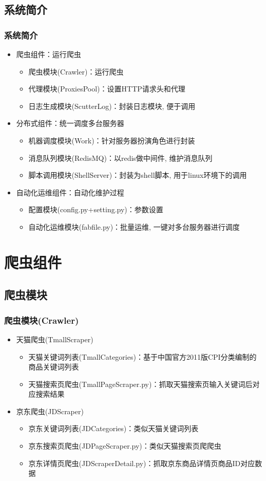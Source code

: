 \documentclass{beamer}
\begin{document}
\subsection{系统简介}
\begin{frame}
\frametitle{系统简介}
\begin{itemize}
\item 爬虫组件：运行爬虫
\begin{itemize}
  \item 爬虫模块(Crawler)：运行爬虫
  \item 代理模块(ProxiesPool)：设置HTTP请求头和代理
  \item 日志生成模块(ScutterLog)：封装日志模块, 便于调用
\end{itemize}
\item 分布式组件：统一调度多台服务器
\begin{itemize}
  \item 机器调度模块(Work)：针对服务器扮演角色进行封装
  \item 消息队列模块(RedisMQ)：以redis做中间件, 维护消息队列
  \item 脚本调用模块(ShellServer)：封装为shell脚本, 用于linux环境下的调用
\end{itemize}
\item 自动化运维组件：自动化维护过程
\begin{itemize}
  \item 配置模块(config.py+setting.py)：参数设置
  \item 自动化运维模块(fabfile.py)：批量运维, 一键对多台服务器进行调度
\end{itemize}
\end{itemize}
\end{frame}


\section{爬虫组件}
\subsection{爬虫模块}
\begin{frame}
\frametitle{爬虫模块(Crawler)}
\begin{itemize}
\item 天猫爬虫(TmallScraper)
\begin{itemize}
\item 天猫关键词列表(TmallCategories)：基于中国官方2011版CPI分类编制的商品关键词列表
\item 天猫搜索页爬虫(TmallPageScraper.py)：抓取天猫搜索页输入关键词后对应搜索结果
\end{itemize}
\item 京东爬虫(JDScraper)
\begin{itemize}
\item 京东关键词列表(JDCategories)：类似天猫关键词列表
\item 京东搜索页爬虫(JDPageScraper.py)：类似天猫搜索页爬爬虫
\item 京东详情页爬虫(JDScraperDetail.py)：抓取京东商品详情页商品ID对应数据
\end{itemize}
\end{itemize}
\end{frame}
\end{document}

